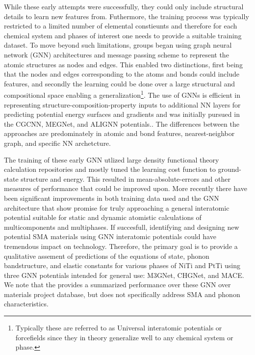\documentclass[preprint]{elsarticle}
\begin{document}
While these early attempts were successfully, they could only include structural details to learn new features from. Futhermore, the training process was typically restricted to a limited number of elemental constieunts and therefore for each chemical system and phases of interest one needs to provide a suitable training dataset. To move beyond such limitations, groups began using graph neural network (GNN) architectures and message passing scheme to represent the atomic structures as nodes and edges. This enabled two distinctions, first being that the nodes and edges corresponding to the atoms and bonds could include features, and secondly the learning could be done over a large structural and compositional space enabling a generalization\footnote{Typically these are referred to as Universal interatomic potentials or forcefields since they in theory generalize well to any chemical system or phase.}. The use of GNNs is efficient in representing structure-composition-property inputs to additional NN layers for predicting potential energy surfaces and gradients and was initially pursued in the CGCNN, MEGNet, and ALIGNN potentials.\cite{Choudhary2021,Chen2019,Xie2018}. The differences between the approaches are predominately in atomic and bond features, nearest-neighbor graph, and specific NN archetcture. \par

The training of these early GNN utlized large density functional theory calculation repositories and mostly tuned the learning cost function to ground-state structure and energy. This resulted in mean-absolute-errors and other measures of performance that could be improved upon.\cite{Riebesell2023} More recently there have been significant improvements in both training data used and the GNN architecture that show promise for truly approaching a general interatomic potential suitable for static and dynamic atomistic calculations of multicomponents and multiphases. If succesfull, identifying and designing new potential SMA materials using GNN interatomic potentials could have tremendous impact on technology. Therefore, the primary goal is to provide a qualitative assement of predictions of the equations of state, phonon bandstructure, and elastic constants for various phases of NiTi and PtTi using three GNN potentials intended for general use: M3GNet, CHGNet, and MACE.\cite{Chen2022,Deng2023,Batatia2022} We note that the \cite{Riebesell2023} provides a summarized performance over these GNN over materials project database, but does not specifically address SMA and phonon characteristics. \par   
\end{document}
